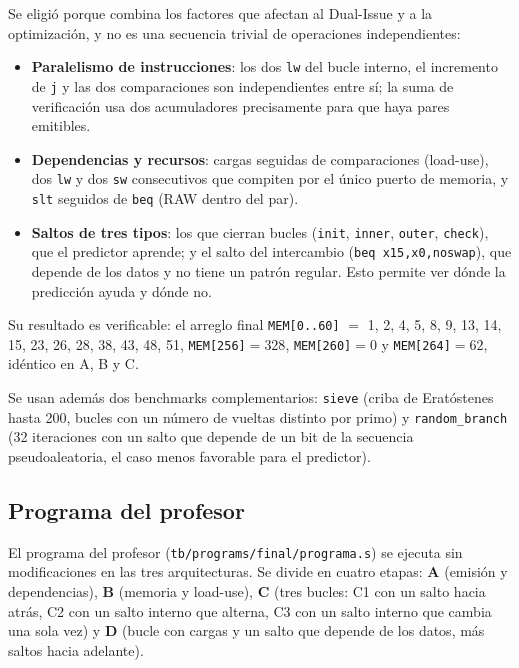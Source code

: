 \documentclass[12pt,a4paper]{article}
\begin{document}
\noindent\begin{minipage}{\linewidth}

\end{minipage}

Se eligió porque combina los factores que afectan al Dual-Issue y a la optimización, y no es una secuencia trivial de operaciones independientes:
\begin{itemize}
    \item \textbf{Paralelismo de instrucciones}: los dos \texttt{lw} del bucle interno, el incremento de \texttt{j} y las dos comparaciones son independientes entre sí; la suma de verificación usa dos acumuladores precisamente para que haya pares emitibles.
    \item \textbf{Dependencias y recursos}: cargas seguidas de comparaciones (load-use), dos \texttt{lw} y dos \texttt{sw} consecutivos que compiten por el único puerto de memoria, y \texttt{slt} seguidos de \texttt{beq} (RAW dentro del par).
    \item \textbf{Saltos de tres tipos}: los que cierran bucles (\texttt{init}, \texttt{inner}, \texttt{outer}, \texttt{check}), que el predictor aprende; y el salto del intercambio (\texttt{beq x15,x0,noswap}), que depende de los datos y no tiene un patrón regular. Esto permite ver dónde la predicción ayuda y dónde no.
\end{itemize}

\noindent Su resultado es verificable: el arreglo final \texttt{MEM[0..60]} $=$ 1, 2, 4, 5, 8, 9, 13, 14, 15, 23, 26, 28, 38, 43, 48, 51, \texttt{MEM[256]}$=328$, \texttt{MEM[260]}$=0$ y \texttt{MEM[264]}$=62$, idéntico en A, B y C.

Se usan además dos benchmarks complementarios: \texttt{sieve} (criba de Eratóstenes hasta 200, bucles con un número de vueltas distinto por primo) y \texttt{random\_branch} (32 iteraciones con un salto que depende de un bit de la secuencia pseudoaleatoria, el caso menos favorable para el predictor).

\subsection{Programa del profesor}
\label{sec:prof}

El programa del profesor (\texttt{tb/programs/final/programa.s}) se ejecuta sin modificaciones en las tres arquitecturas. Se divide en cuatro etapas: \textbf{A} (emisión y dependencias), \textbf{B} (memoria y load-use), \textbf{C} (tres bucles: C1 con un salto hacia atrás, C2 con un salto interno que alterna, C3 con un salto interno que cambia una sola vez) y \textbf{D} (bucle con cargas y un salto que depende de los datos, más saltos hacia adelante).
\end{document}

